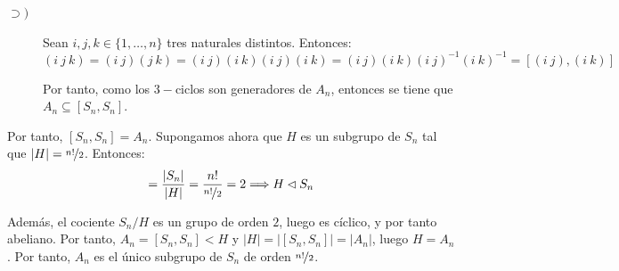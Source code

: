 \begin{ejercicio}
\begin{enumerate}
\begin{description}
            \item[$\supset)$] Sean $i,j,k\in \{1,\ldots,n\}$ tres naturales distintos. Entonces:
            \begin{equation*}
                (i\ j\ k) = (i\ j)(j\ k) = (i\ j)(i\ k)(i\ j)(i\ k)
                = (i\ j)(i\ k)(i\ j)^{-1}(i\ k)^{-1} = [(i\ j),(i\ k)]
            \end{equation*}

            Por tanto, como los $3-$ciclos son generadores de $A_n$, entonces se tiene que $A_n\subseteq [S_n,S_n]$.
        \end{description}

        Por tanto, $[S_n,S_n]=A_n$. Supongamos ahora que $H$ es un subgrupo de $S_n$ tal que $|H|=\nicefrac{n!}{2}$. Entonces:
        \begin{equation*}
            [S_n : H] = \frac{|S_n|}{|H|} = \frac{n!}{\nicefrac{n!}{2}} = 2
            \Longrightarrow H\lhd S_n
        \end{equation*}

        Además, el cociente $S_n/H$ es un grupo de orden $2$, luego es cíclico, y por tanto abeliano. Por tanto, $A_n=[S_n,S_n]<H$ y $|H|=|[S_n,S_n]|=|A_n|$, luego $H=A_n$. Por tanto, $A_n$ es el único subgrupo de $S_n$ de orden $\nicefrac{n!}{2}$.
    \end{enumerate}
\end{ejercicio}
